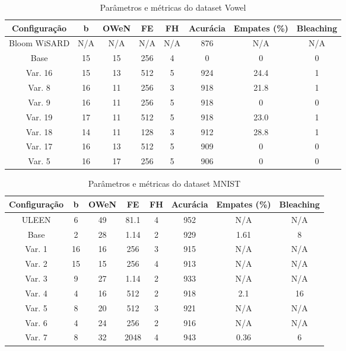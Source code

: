 \documentclass{article}
\begin{document}
{\begin{table}[H]
\caption{Parâmetros e métricas do dataset Vowel}
\begin{tabular}{|c|c|c|c|c|c|c|c|}
\hline
\textbf{Configuração} & \textbf{b} & \textbf{OWeN} & \textbf{FE} & \textbf{FH} & \textbf{Acurácia} & \textbf{Empates (\%)} & \textbf{Bleaching} \\
\hline
Bloom WiSARD & N/A & N/A & N/A & N/A & 876 & N/A & N/A \\
\hline
Base & 15 & 15 & 256 & 4 & 0 & 0 & 0 \\
\hline
Var. 16 & 15 & 13 & 512 & 5 & 924 & 24.4 & 1 \\
\hline
Var. 8 & 16 & 11 & 256 & 3 & 918 & 21.8 & 1 \\
\hline
Var. 9 & 16 & 11 & 256 & 5 & 918 & 0 & 0 \\
\hline
Var. 19 & 17 & 11 & 512 & 5 & 918 & 23.0 & 1 \\
\hline
Var. 18 & 14 & 11 & 128 & 3 & 912 & 28.8 & 1 \\
\hline
Var. 17 & 16 & 13 & 512 & 5 & 909 & 0 & 0 \\
\hline
Var. 5 & 16 & 17 & 256 & 5 & 906 & 0 & 0 \\
\hline
\end{tabular}
\end{table}

\begin{table}[H]
\caption{Parâmetros e métricas do dataset MNIST}
\begin{tabular}{|c|c|c|c|c|c|c|c|}
\hline
\textbf{Configuração} & \textbf{b} & \textbf{OWeN} & \textbf{FE} & \textbf{FH} & \textbf{Acurácia} & \textbf{Empates (\%)} & \textbf{Bleaching} \\
\hline
ULEEN & 6 & 49 & 81.1 & 4 & 952 & N/A & N/A \\
\hline
Base & 2 & 28 & 1.14 & 2 & 929 & 1.61 & 8 \\
\hline
Var. 1 & 16 & 16 & 256 & 3 & 915 & N/A & N/A \\
\hline
Var. 2 & 15 & 15 & 256 & 4 & 913 & N/A & N/A \\
\hline
Var. 3 & 9 & 27 & 1.14 & 2 & 933 & N/A & N/A \\
\hline
Var. 4 & 4 & 16 & 512 & 2 & 918 & 2.1 & 16 \\
\hline
Var. 5 & 8 & 20 & 512 & 3 & 921 & N/A & N/A \\
\hline
Var. 6 & 4 & 24 & 256 & 2 & 916 & N/A & N/A \\
\hline
Var. 7 & 8 & 32 & 2048 & 4 & 943 & 0.36 & 6 \\
\hline
\end{tabular}
\end{table}
}
\end{document}
